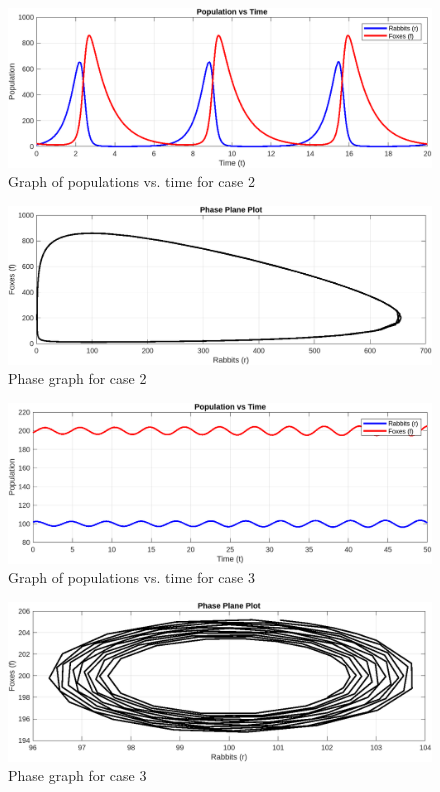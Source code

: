 \documentclass[a4paper, oneside]{article}
\begin{document}
\begin{figure}[h!]
    \centering
    \includegraphics[width=\textwidth]{resources/pop-vs-time-2.png}
    \caption{Graph of populations vs. time for case 2}
    \label{fig:pop-vs-time-2}
\end{figure}
\begin{figure}[h!]
    \centering
    \includegraphics[width=\textwidth]{resources/phase-2.png}
    \caption{Phase graph for case 2}
    \label{fig:phase-2}
\end{figure}

\begin{figure}[h!]
    \centering
    \includegraphics[width=\textwidth]{resources/pop-vs-time-3.png}
    \caption{Graph of populations vs. time for case 3}
    \label{fig:pop-vs-time-3}
\end{figure}
\begin{figure}[h!]
    \centering
    \includegraphics[width=\textwidth]{resources/phase-3.png}
    \caption{Phase graph for case 3}
    \label{fig:phase-3}
\end{figure}
\end{document}
